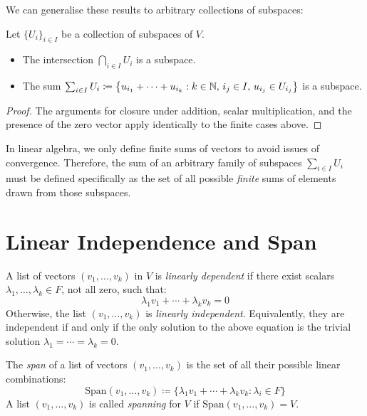 \documentclass[../linear_algebra_and_groups.tex]{subfiles}
\begin{document}
We can generalise these results to arbitrary collections of subspaces:

\begin{proposition}
    \begin{shaded*}
        Let $\{U_i\}_{i\in I}$ be a collection of subspaces of $V$. 
        \begin{itemize}
            \item The intersection $\bigcap_{i\in I} U_i$ is a subspace.
            \item The sum $\sum_{i\in I} U_i \coloneqq \left\{u_{i_1}+\cdots+u_{i_k} : k\in\mathbb{N},\, i_j \in I,\, u_{i_j} \in U_{i_j}\right\}$ is a subspace.
        \end{itemize}
    \end{shaded*}
\end{proposition}
\begin{proof}
    The arguments for closure under addition, scalar multiplication, and the presence of the zero vector apply identically to the finite cases above.
    \qedhere
\end{proof}

\begin{remark}
    In linear algebra, we only define finite sums of vectors to avoid issues of convergence. Therefore, the sum of an arbitrary family of subspaces $\sum_{i\in I} U_i$ must be defined specifically as the set of all possible \textit{finite} sums of elements drawn from those subspaces.
\end{remark}

\section{Linear Independence and Span}

\begin{definition}
    \begin{shaded*}
        A list of vectors $(v_1,\dots,v_k)$ in $V$ is \textit{linearly dependent} if there exist scalars $\lambda_1, \dots, \lambda_k \in F$, not all zero, such that:
        \[ \lambda_1v_1+\cdots+\lambda_kv_k=0 \]
        Otherwise, the list $(v_1,\dots,v_k)$ is \textit{linearly independent}. Equivalently, they are independent if and only if the only solution to the above equation is the trivial solution $\lambda_1=\cdots=\lambda_k=0$.
    \end{shaded*}
\end{definition}

\begin{definition}[Span]
    \begin{shaded*}
        The \textit{span} of a list of vectors $(v_1,\dots,v_k)$ is the set of all their possible linear combinations:
        \[ \text{Span}(v_1,\dots,v_k) \coloneqq \{\lambda_1v_1+\cdots+\lambda_kv_k : \lambda_i\in F\} \]
        A list $(v_1,\dots,v_k)$ is called \textit{spanning} for $V$ if $\text{Span}(v_1,\dots,v_k)=V$.
    \end{shaded*}
\end{definition}
\end{document}
